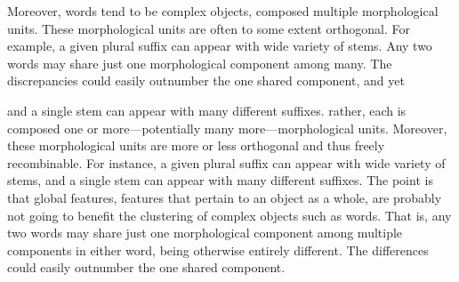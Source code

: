 Moreover, words tend to be complex objects, composed multiple morphological units.
These morphological units are often to some extent orthogonal. For example, a given 
plural suffix can appear with wide variety of stems. Any two words may share 
just one morphological component among many. The discrepancies could easily 
outnumber the one shared component, and yet 

and a single stem can appear with many different suffixes. 
rather, each is composed one or more---potentially many more---morphological units. 
Moreover, these morphological units are more or less orthogonal and thus freely recombinable. 
For instance, a given plural suffix can appear with wide variety of stems, 
and a single stem can appear with many different suffixes. The point 
is that global features, features 
that pertain to an object as a whole, are probably not going to benefit the %
clustering of complex objects such as words. That is, any two words may share 
just one morphological component among multiple components in either word,
being otherwise entirely different. The differences  could easily 
outnumber the one shared component. 



